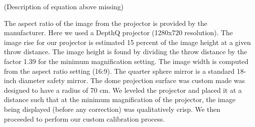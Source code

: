 \documentclass[10pt,letterpaper]{article}
\begin{document}
(Description of equation above missing)

The aspect ratio of the image from the projector is provided by the manufacturer. Here we used a DepthQ projector (1280x720 resolution).  The image rise for our 
projector is estimated 15 percent of the image height at a given throw distance. The image height is found by dividing the throw distance by the factor 1.39 for the 
minimum magnification setting. The image width is computed from the aspect ratio setting (16:9). The quarter sphere mirror is a standard 18-inch diameter safety 
mirror. The dome projection surface was custom made was designed to have a radius of 70 cm. We leveled the projector and placed it at a distance such that at the 
minimum magnification of the projector, the image being displayed (before any correction) was qualitatively crisp. We then proceeded to perform our custom 
calibration process.
\end{document}

